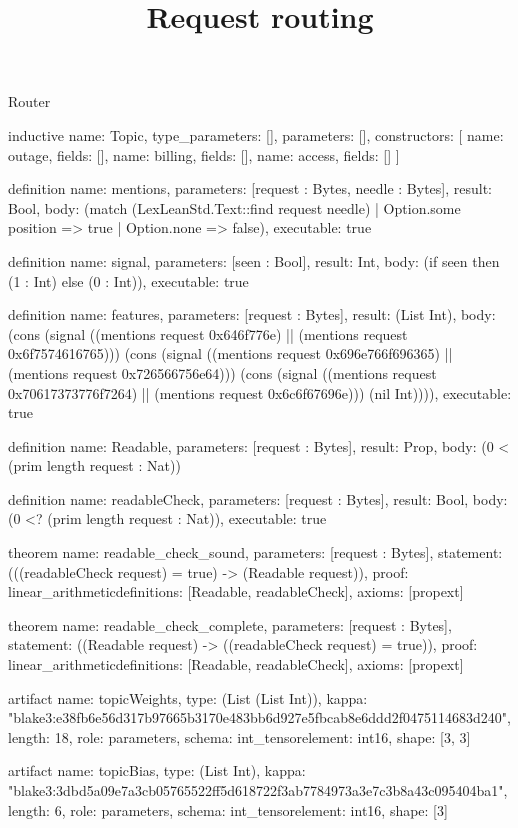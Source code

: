 \begin{lexlean}{Router}
\title{Request routing}
\begin{semanticmodule}
inductive{
  name: Topic,
  type_parameters: [],
  parameters: [],
  constructors: [
    {name: outage, fields: []},
    {name: billing, fields: []},
    {name: access, fields: []}
  ]
}

definition{
  name: mentions,
  parameters: [request : Bytes, needle : Bytes],
  result: Bool,
  body: (match (LexLeanStd.Text::find request needle)
    | Option.some position => true
    | Option.none => false),
  executable: true
}

definition{
  name: signal,
  parameters: [seen : Bool],
  result: Int,
  body: (if seen then (1 : Int) else (0 : Int)),
  executable: true
}

definition{
  name: features,
  parameters: [request : Bytes],
  result: (List Int),
  body: (cons (signal ((mentions request 0x646f776e) || (mentions request 0x6f7574616765))) (cons (signal ((mentions request 0x696e766f696365) || (mentions request 0x726566756e64))) (cons (signal ((mentions request 0x70617373776f7264) || (mentions request 0x6c6f67696e))) (nil Int)))),
  executable: true
}

definition{
  name: Readable,
  parameters: [request : Bytes],
  result: Prop,
  body: (0 < (prim length request : Nat))
}

definition{
  name: readableCheck,
  parameters: [request : Bytes],
  result: Bool,
  body: (0 <? (prim length request : Nat)),
  executable: true
}

theorem{
  name: readable_check_sound,
  parameters: [request : Bytes],
  statement: (((readableCheck request) = true) -> (Readable request)),
  proof: linear_arithmetic{definitions: [Readable, readableCheck]},
  axioms: [propext]
}

theorem{
  name: readable_check_complete,
  parameters: [request : Bytes],
  statement: ((Readable request) -> ((readableCheck request) = true)),
  proof: linear_arithmetic{definitions: [Readable, readableCheck]},
  axioms: [propext]
}

artifact{
  name: topicWeights,
  type: (List (List Int)),
  kappa: "blake3:e38fb6e56d317b97665b3170e483bb6d927e5fbcab8e6ddd2f0475114683d240",
  length: 18,
  role: parameters,
  schema: int_tensor{element: int16, shape: [3, 3]}
}

artifact{
  name: topicBias,
  type: (List Int),
  kappa: "blake3:3dbd5a09e7a3cb05765522ff5d618722f3ab7784973a3e7c3b8a43c095404ba1",
  length: 6,
  role: parameters,
  schema: int_tensor{element: int16, shape: [3]}
}


\end{semanticmodule}
\end{lexlean}
